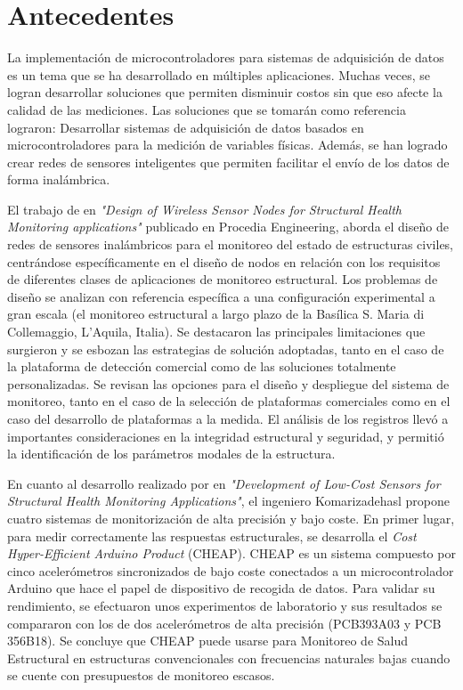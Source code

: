 \section{Antecedentes}

La implementación de microcontroladores para sistemas de adquisición de datos es un tema que se ha desarrollado en múltiples aplicaciones. Muchas veces, se logran desarrollar soluciones que permiten disminuir costos sin que eso afecte la calidad de las mediciones. Las soluciones que se tomarán como referencia lograron: Desarrollar sistemas de adquisición de datos basados en microcontroladores para la medición de variables físicas. Además, se han logrado crear redes de sensores inteligentes que permiten facilitar el envío de los datos de forma inalámbrica.


El trabajo de \cite{federici2014design} en \textit{"Design of Wireless Sensor Nodes for Structural Health Monitoring applications"} publicado en Procedia Engineering, aborda el diseño de redes de sensores inalámbricos para el monitoreo del estado de estructuras civiles, centrándose específicamente en el diseño de nodos en relación con los requisitos de diferentes clases de aplicaciones de monitoreo estructural.
Los problemas de diseño se analizan con referencia específica a una configuración experimental a gran escala (el monitoreo estructural a largo plazo de la Basílica S. Maria di Collemaggio, L'Aquila, Italia). Se destacaron las principales limitaciones que surgieron y se esbozan las estrategias de solución adoptadas, tanto en el caso de la plataforma de detección comercial como de las soluciones totalmente personalizadas. Se revisan las opciones para el diseño y despliegue del sistema de monitoreo, tanto en el caso de la selección de plataformas comerciales como en el caso del desarrollo de plataformas a la medida. El análisis de los registros llevó a importantes consideraciones en la integridad estructural y seguridad, y permitió la identificación de los parámetros modales de la estructura.

En cuanto al desarrollo realizado por \cite{komarizadehasl2022development} en \textit{"Development of Low-Cost Sensors for Structural Health Monitoring Applications"}, el ingeniero Komarizadehasl propone cuatro sistemas de monitorización de alta precisión y bajo coste.
En primer lugar, para medir correctamente las respuestas estructurales, se desarrolla el \textit{Cost Hyper-Efficient Arduino Product} (CHEAP). CHEAP es un sistema compuesto por cinco acelerómetros sincronizados de bajo coste conectados a un microcontrolador Arduino que hace el papel de dispositivo de recogida de datos. Para validar su rendimiento, se efectuaron unos experimentos de laboratorio y sus resultados se compararon con los de dos acelerómetros de alta precisión (PCB393A03 y PCB 356B18). Se concluye que CHEAP puede usarse para Monitoreo de Salud Estructural en estructuras convencionales con frecuencias naturales bajas cuando se cuente con presupuestos de monitoreo escasos. 

